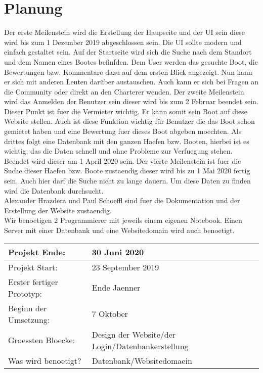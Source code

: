 \documentclass[12pt]{article}
\theoremstyle{definition}
\begin{document}
\section{Planung}
Der erste Meilenstein wird die Erstellung der Haupseite und der UI sein diese wird bis zum 1 Dezember 2019 abgeschlossen sein.
Die UI sollte modern und einfach gestaltet sein. Auf der Startseite wird sich die Suche nach dem Standort und dem Namen eines Bootes befinfden. Dem User werden das gesuchte Boot, die Bewertungen bzw. Kommentare dazu auf dem ersten Blick angezeigt. Nun kann er sich mit anderen Leuten darüber austauschen. Auch kann er sich bei Fragen an die Community oder direkt an den Charterer wenden. 
Der zweite Meilenstein wird das Anmelden der Benutzer sein dieser wird bis zum 2 Februar beendet sein. Dieser Punkt ist fuer die Vermieter wichtig. Er kann somit sein Boot auf diese Website stellen. Auch ist diese Funktion wichtig für Benutzer die das Boot schon gemietet haben und eine Bewertung fuer dieses Boot abgeben moechten.
Als drittes folgt eine Datenbank mit den ganzen Haefen bzw. Booten, hierbei ist es wichtig, das die Daten schnell und ohne Probleme zur Verfuegung stehen. Beendet wird dieser am 1 April 2020 sein. 
Der vierte Meilenstein ist fuer die Suche dieser Haefen bzw. Boote zustaendig dieser wird bis zu 1 Mai 2020 fertig sein. Auch hier darf die Suche nicht zu lange dauern. Um diese Daten zu finden wird die Datenbank durchsucht.
\\ Alexander Hrazdera und Paul Schoeffl sind fuer die Dokumentation und der Erstellung der Website zustaendig.\\ Wir benoetigen 2 Programmierer mit jeweils einem eigenen Notebook. Einen Server mit einer Datenbank und eine Websitedomain wird auch benoetigt.

\newcommand{\projektend}{30 Juni 2020}
\newcommand{\projectstart}{23 September 2019}
\newcommand{\firstresult}{Ende Jaenner}
\newcommand{\beginofprog}{7 Oktober}
\newcommand{\bigBlocks}{Design der Website/der Login/Datenbankerstellung}
\newcommand{\whatisneeded}{Datenbank/Websitedomaein}

\begin{flushleft} 
\begin{tabular}{|l|l|}
\hline
Projekt Ende: & \projektend \\ \hline
Projekt Start: & \projectstart \\ \hline
Erster fertiger Prototyp: & \firstresult \\ \hline
Beginn der Umsetzung: & \beginofprog \\ \hline
Groessten Bloecke: & \bigBlocks \\ \hline
Was wird benoetigt? & \whatisneeded \\ \hline
\end{tabular}
\end{flushleft}
\cite{wikipedia_2016}
{}

\end{document}
